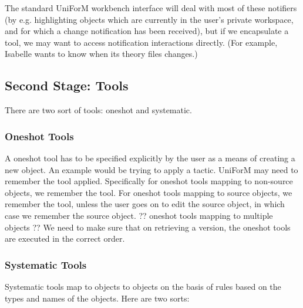 \documentclass[a4paper]{article}
\begin{document}
The standard UniForM workbench interface will deal with most of these
notifiers (by e.g. highlighting objects which are currently in the
user's private workspace, and for which a change notification has been
received), but if we encapsulate a tool, we may want to access
notification interactions directly. (For example, Isabelle wants to
know when its theory files changes.)


\subsection{Second Stage: Tools}

There are two sort of tools: oneshot and systematic.  

\subsubsection{Oneshot Tools}

A oneshot tool has to be specified explicitly by the user as a means of 
creating a new object.  An example would be trying to apply a tactic.
UniForM may need to remember the tool applied.  Specifically for oneshot
tools mapping to non-source objects, we remember the tool.  For oneshot
tools mapping to source objects, we remember the tool, unless the user
goes on to edit the source object, in which case we remember the source
object.  ?? oneshot tools mapping to multiple objects ??  We need to make
sure that on retrieving a version, the oneshot tools are executed in the
correct order.

  

\subsubsection{Systematic Tools}

Systematic tools map to objects to objects on the basis of rules based on
the types and names of the objects.  Here are two sorts:
\end{document}
